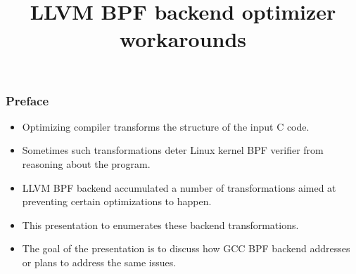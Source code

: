 \documentclass{beamer}
\title{LLVM BPF backend optimizer workarounds}
\date{}
\begin{document}
\frame{\titlepage}

\begin{frame}[fragile]
\frametitle{Preface}

\begin{itemize}
\item Optimizing compiler transforms the structure of the input C code.
\item Sometimes such transformations deter Linux kernel BPF verifier
      from reasoning about the program.
\item LLVM BPF backend accumulated a number of transformations
      aimed at preventing certain optimizations to happen.
\item This presentation to enumerates these backend transformations.
\item The goal of the presentation is to discuss how GCC BPF backend
      addresses or plans to address the same issues.
\end{itemize}



\end{frame}
\end{document}
